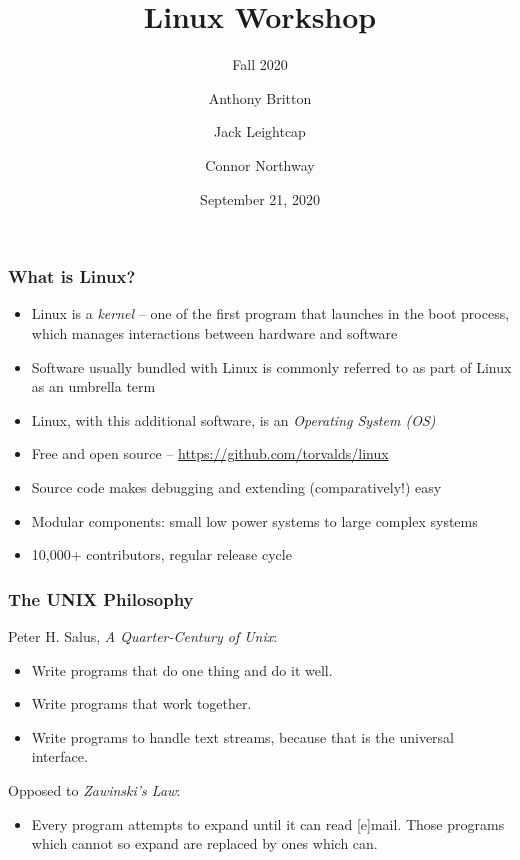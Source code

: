 \documentclass{beamer} \usetheme{Madrid}
\title{Linux Workshop}
\subtitle{Fall 2020}
\author[]{Anthony Britton\inst{1} \and Jack Leightcap\inst{1}\inst{2} \and Connor Northway\inst{2}}
\institute[IEEE, Wireless Club]{
    \inst{1}IEEE -- \url{nuieeeofficers@gmail.com}
    \and
    \inst{2}Wireless Club -- \url{nuwirelessclub@gmail.com}
}
\date[Fall 2020]{September 21, 2020}
\begin{document}
\frame{\titlepage}

\begin{frame}
    \frametitle{What is Linux?}
    \begin{itemize}
        \item Linux is a \emph{kernel} -- one of the first program that launches in the boot process, which manages interactions between hardware and software
        \item Software usually bundled with Linux is commonly referred to as part of Linux as an umbrella term
        \item Linux, with this additional software, is an \emph{Operating System (OS)}
    \end{itemize}
    \begin{itemize}
        \item Free and open source -- \url{https://github.com/torvalds/linux}
        \item Source code makes debugging and extending (comparatively!) easy
        \item Modular components: small low power systems to large complex systems
        \item 10,000+ contributors, regular release cycle
    \end{itemize}
\end{frame}

\begin{frame}
    \frametitle{The UNIX Philosophy}
    \vfill
    Peter H. Salus, \emph{A Quarter-Century of Unix}:
    \begin{itemize}
        \item Write programs that do one thing and do it well.
        \item Write programs that work together.
        \item Write programs to handle text streams, because that is the universal interface.
    \end{itemize}
    \vspace{1cm}
    Opposed to \emph{Zawinski's Law}:
    \begin{itemize}
        \item Every program attempts to expand until it can read [e]mail.
            Those programs which cannot so expand are replaced by ones which can.
    \end{itemize}
    \vfill
\end{frame}
\end{document}
